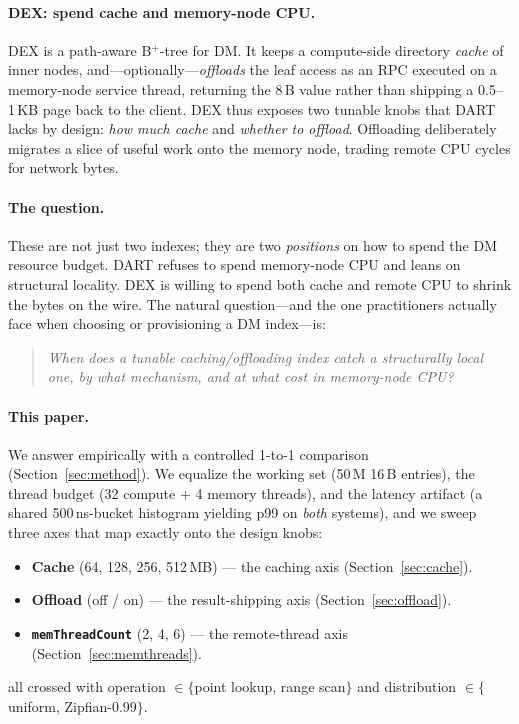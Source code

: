 \documentclass[sigconf,nonacm]{acmart}
\begin{document}
\paragraph{DEX: spend cache and memory-node CPU.}
DEX is a path-aware B$^+$-tree for DM. It keeps a compute-side directory
\emph{cache} of inner nodes, and---optionally---\emph{offloads} the leaf access
as an RPC executed on a memory-node service thread, returning the 8\,B value
rather than shipping a 0.5--1\,KB page back to the client. DEX thus exposes two
tunable knobs that DART lacks by design: \emph{how much cache} and \emph{whether
to offload}. Offloading deliberately migrates a slice of useful work onto the
memory node, trading remote CPU cycles for network bytes.

\paragraph{The question.}
These are not just two indexes; they are two \emph{positions} on how to spend the
DM resource budget. DART refuses to spend memory-node CPU and leans on structural
locality. DEX is willing to spend both cache and remote CPU to shrink the bytes
on the wire. The natural question---and the one practitioners actually face when
choosing or provisioning a DM index---is:
\begin{quote}\itshape
When does a tunable caching/offloading index catch a structurally local one, by
what mechanism, and at what cost in memory-node CPU?
\end{quote}

\paragraph{This paper.}
We answer empirically with a controlled 1-to-1 comparison
(Section~\ref{sec:method}). We equalize the working set (50\,M 16\,B entries),
the thread budget (32 compute $+$ 4 memory threads), and the latency artifact
(a shared 500\,ns-bucket histogram yielding p99 on \emph{both} systems), and we
sweep three axes that map exactly onto the design knobs:
\begin{itemize}
  \item \textbf{Cache} (64, 128, 256, 512\,MB) --- the caching axis
        (Section~\ref{sec:cache}).
  \item \textbf{Offload} (off / on) --- the result-shipping axis
        (Section~\ref{sec:offload}).
  \item \textbf{\texttt{memThreadCount}} (2, 4, 6) --- the remote-thread axis
        (Section~\ref{sec:memthreads}).
\end{itemize}
all crossed with operation $\in\{$point lookup, range scan$\}$ and distribution
$\in\{$uniform, Zipfian-0.99$\}$.
\end{document}
